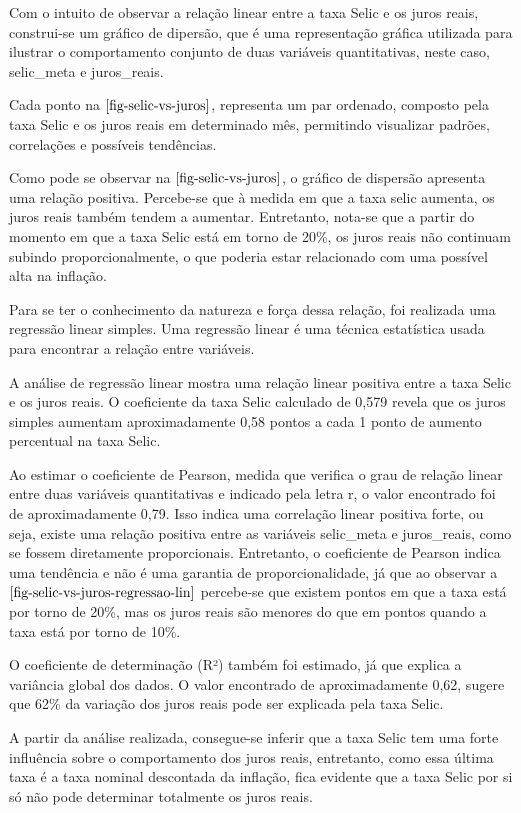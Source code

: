 \documentclass[
  portuguese,
]{estat}
\begin{document}
Com o intuito de observar a relação linear entre a taxa Selic e os juros
reais, construi-se um gráfico de dipersão, que é uma representação
gráfica utilizada para ilustrar o comportamento conjunto de duas
variáveis quantitativas, neste caso, selic\_meta e juros\_reais.

Cada ponto na \(\ref{fig-selic-vs-juros}\), representa um par ordenado,
composto pela taxa Selic e os juros reais em determinado mês, permitindo
visualizar padrões, correlações e possíveis tendências.

Como pode se observar na \(\ref{fig-selic-vs-juros}\), o gráfico de
dispersão apresenta uma relação positiva. Percebe-se que à medida em que
a taxa selic aumenta, os juros reais também tendem a aumentar.
Entretanto, nota-se que a partir do momento em que a taxa Selic está em
torno de 20\%, os juros reais não continuam subindo proporcionalmente, o
que poderia estar relacionado com uma possível alta na inflação.

Para se ter o conhecimento da natureza e força dessa relação, foi
realizada uma regressão linear simples. Uma regressão linear é uma
técnica estatística usada para encontrar a relação entre variáveis.

A análise de regressão linear mostra uma relação linear positiva entre a
taxa Selic e os juros reais. O coeficiente da taxa Selic calculado de
0,579 revela que os juros simples aumentam aproximadamente 0,58 pontos a
cada 1 ponto de aumento percentual na taxa Selic.

Ao estimar o coeficiente de Pearson, medida que verifica o grau de
relação linear entre duas variáveis quantitativas e indicado pela letra
r, o valor encontrado foi de aproximadamente 0,79. Isso indica uma
correlação linear positiva forte, ou seja, existe uma relação positiva
entre as variáveis selic\_meta e juros\_reais, como se fossem
diretamente proporcionais. Entretanto, o coeficiente de Pearson indica
uma tendência e não é uma garantia de proporcionalidade, já que ao
observar a \(\ref{fig-selic-vs-juros-regressao-lin}\) percebe-se que
existem pontos em que a taxa está por torno de 20\%, mas os juros reais
são menores do que em pontos quando a taxa está por torno de 10\%.

O coeficiente de determinação (R²) também foi estimado, já que explica a
variância global dos dados. O valor encontrado de aproximadamente 0,62,
sugere que 62\% da variação dos juros reais pode ser explicada pela taxa
Selic.

A partir da análise realizada, consegue-se inferir que a taxa Selic tem
uma forte influência sobre o comportamento dos juros reais, entretanto,
como essa última taxa é a taxa nominal descontada da inflação, fica
evidente que a taxa Selic por si só não pode determinar totalmente os
juros reais.
\end{document}
